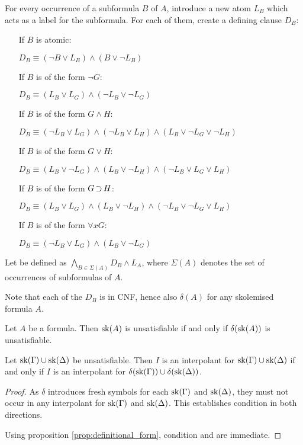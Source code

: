 \begin{defi}
For every occurrence of a subformula $B$ of $A$, introduce a new atom $L_B$ which acts as a label for the subformula. 
For each of them, create a defining clause $D_B$:

\begin{itemize}
	\item[If $B$ is atomic:]~

	$D_B\equiv (\lnot B \lor L_B) \land (B \lor \lnot L_B)  $
	\item[If $B$ is of the form $\lnot G$:]~

	$D_B\equiv (L_B \lor L_G) \land (\lnot L_B \lor \lnot L_G)  $
	\item[If $B$ is of the form $G \land H$:]~

		$D_B\equiv (\lnot L_B \lor L_G) \land (\lnot L_B \lor L_H) \land (L_B \lor \lnot L_G \lor \lnot L_H)  $
	\item[If $B$ is of the form $G \lor H$:]~

		$D_B\equiv (L_B \lor \lnot L_G) \land (L_B \lor \lnot L_H) \land (\lnot L_B \lor L_G \lor L_H)  $
	\item[If $B$ is of the form $G \operatorname{\supset} H$:]~

		$D_B\equiv (L_B \lor L_G) \land (L_B \lor \lnot L_H) \land (\lnot L_B \lor \lnot L_G \lor L_H)  $
	\item[If $B$ is of the form $\forall x G$:]~

		$D_B\equiv (\lnot L_B \lor L_G) \land (L_B \lor \lnot L_G)$
\end{itemize}

Let  be defined as $\bigwedge_{B \in \Sigma(A)} D_B \land L_A$, where $\Sigma(A)$ denotes the set of occurrences of subformulas of $A$.
\end{defi}

Note that each of the $D_B$ is in CNF, hence also $\delta(A)$ for any skolemised formula $A$.

\begin{prop}
	\label{prop:definitional_form}
	Let $A$ be a formula. Then $\operatorname{sk}(A)$ is unsatisfiable if and only if $\delta(\operatorname{sk}(A))$ is unsatisfiable.
\end{prop}

\begin{prop}
	Let $\operatorname{sk}(\Gamma) \cup \operatorname{sk}(\Delta)$ be unsatisfiable.
	Then $I$ is an interpolant for \mbox{$\operatorname{sk}(\Gamma) \cup \operatorname{sk}(\Delta)$} if and only if 
	$I$ is an interpolant for $\delta(\operatorname{sk}(\Gamma)) \cup \delta(\operatorname{sk}(\Delta))$.
\end{prop}
\begin{proof}
	As $\delta$ introduces fresh symbols for each $\operatorname{sk}(\Gamma)$ and $\operatorname{sk}(\Delta)$, they must not occur in any interpolant for $\operatorname{sk}(\Gamma)$ and $\operatorname{sk}(\Delta)$. 
	This establishes condition  in both directions.

Using proposition \ref{prop:definitional_form}, condition  and  are immediate.
\end{proof}

